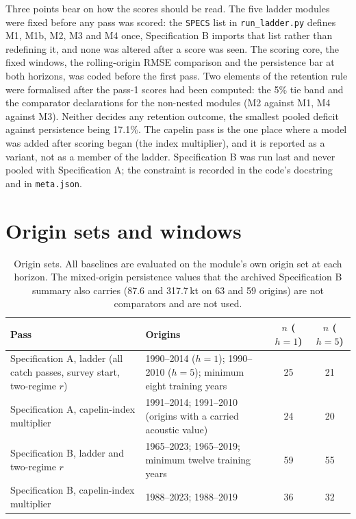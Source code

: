\documentclass[preprint,11pt,authoryear]{elsarticle}
\theoremstyle{remark}
\begin{document}
Three points bear on how the scores should be read. The five ladder modules were fixed before any pass was scored: the \texttt{SPECS} list in \texttt{run\_ladder.py} defines M1, M1b, M2, M3 and M4 once, Specification B imports that list rather than redefining it, and none was altered after a score was seen. The scoring core, the fixed windows, the rolling-origin RMSE comparison and the persistence bar at both horizons, was coded before the first pass. Two elements of the retention rule were formalised after the pass-1 scores had been computed: the 5\% tie band and the comparator declarations for the non-nested modules (M2 against M1, M4 against M3). Neither decides any retention outcome, the smallest pooled deficit against persistence being 17.1\%. The capelin pass is the one place where a model was added after scoring began (the index multiplier), and it is reported as a variant, not as a member of the ladder. Specification B was run last and never pooled with Specification A; the constraint is recorded in the code's docstring and in \texttt{meta.json}.

\section{Origin sets and windows}\label{si:origins}

\begin{table}[!htb]
\centering\small
\caption{Origin sets. All baselines are evaluated on the module's own origin set at each horizon. The mixed-origin persistence values that the archived Specification B summary also carries (87.6 and 317.7\,kt on 63 and 59 origins) are not comparators and are not used.}
\begin{tabularx}{\textwidth}{@{}>{\raggedright\arraybackslash}p{}Lcc@{}}
\toprule
Pass & Origins & $n$ ($h=1$) & $n$ ($h=5$) \\
\midrule
Specification A, ladder (all catch passes, survey start, two-regime $r$) & 1990--2014 ($h=1$); 1990--2010 ($h=5$); minimum eight training years & 25 & 21 \\
Specification A, capelin-index multiplier & 1991--2014; 1991--2010 (origins with a carried acoustic value) & 24 & 20 \\
Specification B, ladder and two-regime $r$ & 1965--2023; 1965--2019; minimum twelve training years & 59 & 55 \\
Specification B, capelin-index multiplier & 1988--2023; 1988--2019 & 36 & 32 \\
\bottomrule
\end{tabularx}
\end{table}
\end{document}
